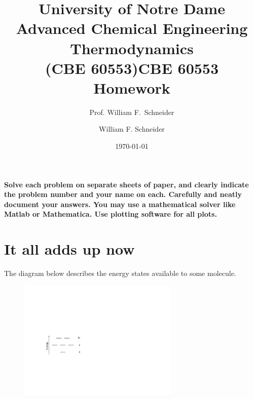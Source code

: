 \documentclass[11pt]{article}
\title{University of Notre Dame\\Advanced Chemical Engineering Thermodynamics\\(CBE 60553)}
\author{Prof. William F.\ Schneider}
\author{William F. Schneider}
\date{\today}
\title{CBE 60553 Homework}
\begin{document}
\begin{OPTIONS}
\end{OPTIONS}

\noindent \textbf{Solve each problem on separate sheets of paper, and clearly indicate the problem number and your name on each.  Carefully and neatly document your answers.  You may use a mathematical solver like Matlab or Mathematica. Use plotting software for all plots.}

\section{It all adds up now}
\label{sec:org5c913f6}
The diagram below describes the energy states available to some molecule.

\begin{figure}[htbp]
\centering
\includegraphics[width=3in]{./figs/Six-state.pdf}
\end{figure}
\end{document}
